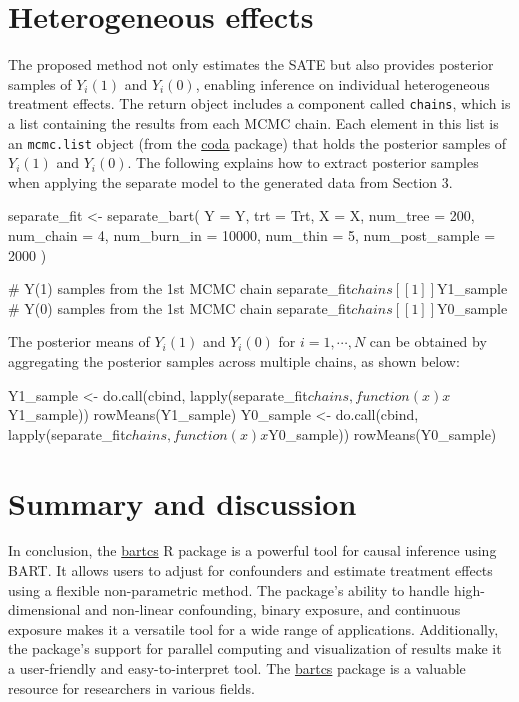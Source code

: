 \section{Heterogeneous effects} \label{sec:hetero}
The proposed method not only estimates the SATE but also provides posterior samples of $Y_i(1)$ and $Y_i(0)$, enabling inference on individual heterogeneous treatment effects. The return object includes a component called \verb|chains|, which is a list containing the results from each MCMC chain. Each element in this list is an \verb|mcmc.list| object (from the \href{https://cran.r-project.org/web/packages/coda/index.html}{coda} package) that holds the posterior samples of $Y_i(1)$ and $Y_i(0)$. The following explains how to extract posterior samples when applying the separate model to the generated data from Section 3.
\begin{example}
separate_fit <- separate_bart(
  Y = Y, trt = Trt, X = X, num_tree = 200, num_chain = 4,
  num_burn_in = 10000, num_thin = 5, num_post_sample = 2000
)

# Y(1) samples from the 1st MCMC chain
separate_fit$chains[[1]]$Y1_sample
# Y(0) samples from the 1st MCMC chain
separate_fit$chains[[1]]$Y0_sample
\end{example}
The posterior means of $Y_i(1)$ and $Y_i(0)$ for $i=1, \cdots, N$ can be obtained by aggregating the posterior samples across multiple chains, as shown below:
\begin{example}
Y1_sample <- do.call(cbind, lapply(separate_fit$chains, function(x) x$Y1_sample))
rowMeans(Y1_sample)
Y0_sample <- do.call(cbind, lapply(separate_fit$chains, function(x) x$Y0_sample))
rowMeans(Y0_sample)
\end{example}


\section{Summary and discussion} \label{sec:summary}

In conclusion, the \href{https://CRAN.R-project.org/package=bartcs}{bartcs} R package is a powerful tool for causal inference using BART. It allows users to adjust for confounders and estimate treatment effects using a flexible non-parametric method. The package's ability to handle high-dimensional and non-linear confounding, binary exposure, and continuous exposure makes it a versatile tool for a wide range of applications. Additionally, the package's support for parallel computing and visualization of results make it a user-friendly and easy-to-interpret tool. The \href{https://CRAN.R-project.org/package=bartcs}{bartcs} package is a valuable resource for researchers in various fields.

